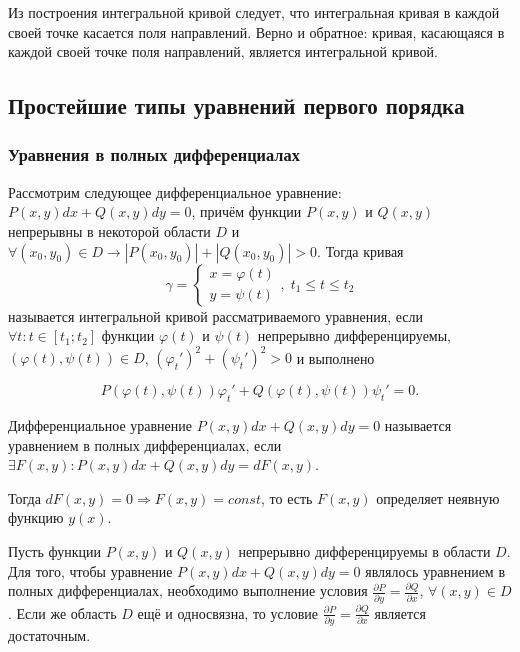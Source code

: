 Из построения интегральной кривой следует, что интегральная кривая в каждой своей точке касается поля направлений. Верно и обратное: кривая, касающаяся в каждой своей точке поля направлений, является интегральной кривой.

\subsection{Простейшие типы уравнений первого порядка}
\subsubsection{Уравнения в полных дифференциалах}

Рассмотрим следующее дифференциальное уравнение: $P(x, y)dx + Q(x, y)dy = 0$, причём функции $P(x, y)$ и $Q(x, y)$ непрерывны в некоторой области $D$ и $\forall (x_0, y_0) \in D \rightarrow |P(x_0, y_0)| + |Q(x_0, y_0)| > 0$. Тогда кривая 
\begin{equation}
    \gamma = 
    \begin{cases}
        x = \varphi(t) \\ 
        y = \psi(t)
    \end{cases}, \; t_1 \leqslant t \leqslant t_2
\end{equation}
называется интегральной кривой рассматриваемого уравнения, если $\forall t: t \in [t_1; t_2]$ функции $\varphi(t)$ и $\psi(t)$ непрерывно дифференцируемы, $(\varphi(t), \psi(t)) \in D$, $(\varphi_t')^2 + (\psi_t')^2 > 0$ и выполнено

\begin{equation}
    P(\varphi(t), \psi(t)) \varphi_t' + Q(\varphi(t), \psi(t)) \psi_t' = 0.
\end{equation}

\begin{definition}
    Дифференциальное уравнение $P(x, y)dx + Q(x, y)dy = 0$ называется уравнением в полных дифференциалах, если $\exists F(x, y): P(x, y)dx + Q(x, y)dy = dF(x, y)$. 
\end{definition}

Тогда $dF(x, y) = 0 \Rightarrow F(x, y) = const$, то есть $F(x, y)$ определяет неявную функцию $y(x)$.

\begin{theorem}
    Пусть функции $P(x, y)$ и $Q(x, y)$ непрерывно дифференцируемы в области $D$. Для того, чтобы уравнение $P(x, y)dx + Q(x, y)dy = 0$ являлось уравнением в полных дифференциалах, необходимо выполнение условия $\frac{\partial P}{\partial y} = \frac{\partial Q}{\partial x}$, $\forall (x, y) \in D$. Если же область $D$ ещё и односвязна, то условие $\frac{\partial P}{\partial y} = \frac{\partial Q}{\partial x}$ является достаточным.
\end{theorem}

